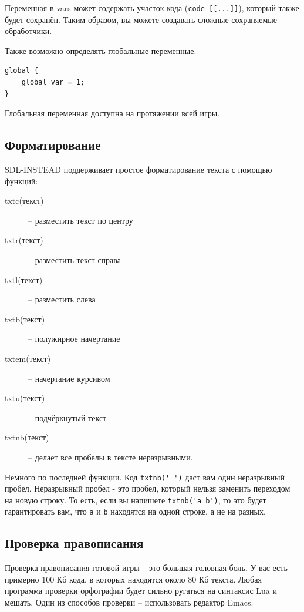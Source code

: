 \documentclass[a4paper,12pt]{article}
\begin{document}
Переменная в vars может содержать участок кода (\verb/code [[...]]/), который также будет сохранён. Таким образом, вы можете создавать сложные сохраняемые обработчики.

Также возможно определять глобальные переменные:
\begin{verbatim}
global {
    global_var = 1;
}
\end{verbatim}
Глобальная переменная доступна на протяжении всей игры.

\subsection{Форматирование}
SDL-INSTEAD поддерживает простое форматирование текста с помощью функций:

\begin{description}
\item[txtc(текст)]  -- разместить текст по центру
\item[txtr(текст)]  -- разместить текст справа
\item[txtl(текст)]  -- разместить слева
\item[txtb(текст)]  -- полужирное начертание
\item[txtem(текст)]  -- начертание курсивом
\item[txtu(текст)]  -- подчёркнутый текст
\item[txtnb(текст)]  -- делает все пробелы в тексте неразрывными.
\end{description}

Немного по последней функции. Код \verb/txtnb(' ')/ даст вам один неразрывный пробел. Неразрывный пробел - это пробел, который нельзя заменить переходом на новую строку. То есть, если вы напишете \verb/txtnb('a b')/, то это будет гарантировать вам, что \verb/a/ и \verb/b/ находятся на одной строке, а не на разных.

\subsection{Проверка правописания}
Проверка правописания готовой игры -- это большая головная боль. У вас есть примерно 100 Кб кода, в которых находятся около 80 Кб текста. Любая программа проверки орфографии будет сильно ругаться на синтаксис Lua и мешать. Один из способов проверки -- использовать редактор Emacs.
\end{document}
